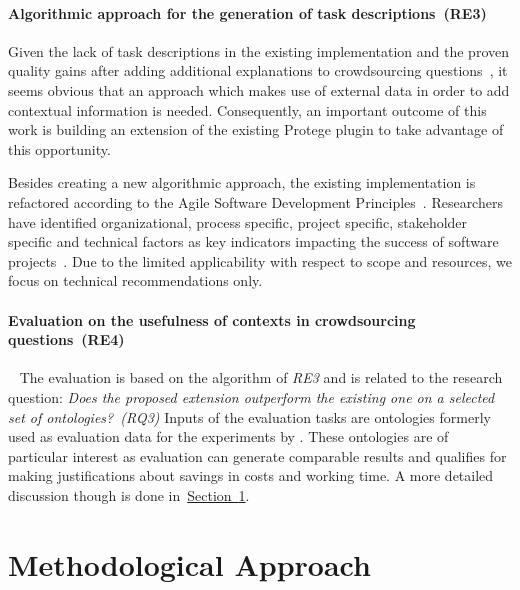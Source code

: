 \documentclass[12pt, notitlepage]{article}
\begin{document}
\paragraph{Algorithmic approach for the generation of task descriptions~(RE3)~}
Given the lack of task descriptions in the existing implementation and the proven quality gains after adding additional explanations to crowdsourcing questions~\cite{mortensen2013developing}, it seems obvious that an approach which makes use of external data in order to add contextual information is needed. Consequently, an important outcome of this work is building an extension of the existing Protege plugin to take advantage of this opportunity.

Besides creating a new algorithmic approach, the existing implementation is refactored according to the Agile Software Development Principles~\cite{martin2002agile}. Researchers have identified organizational, process specific, project specific, stakeholder specific and technical factors as key indicators impacting the success of software projects~\cite{chow2008survey}. Due to the limited applicability with respect to scope and resources, we focus on technical recommendations only. 
\paragraph{Evaluation on the usefulness of contexts in crowdsourcing questions~(RE4)}~
The evaluation is based on the algorithm of \emph{RE3} and is related to the research question: \emph{Does the proposed extension outperform the existing one on a selected set of ontologies?~(RQ3)} Inputs of the evaluation tasks are ontologies formerly used as evaluation data for the experiments by \citet{wohlgenannt2016crowd}. These ontologies are of particular interest as evaluation can generate comparable results and qualifies for making justifications about savings in costs and working time. A more detailed discussion though is done in~\hyperref[sec:methodology]{Section~\ref*{sec:methodology}}. 

\section{Methodological Approach}
\label{sec:methodology}
\end{document}
